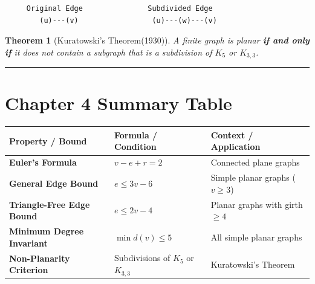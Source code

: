 \documentclass[
]{book}
\newcounter{none} %
\newtheorem{theorem}{Theorem}[chapter]
\theoremstyle{definition}
\theoremstyle{definition}
\theoremstyle{definition}
\theoremstyle{definition}
\theoremstyle{remark}
\begin{document}
\begin{verbatim}
     Original Edge               Subdivided Edge
        (u)---(v)                 (u)---(w)---(v)
\end{verbatim}

\begin{theorem}[Kuratowski's Theorem(1930)]
\protect\hypertarget{thm:unnamed-chunk-33}{}\label{thm:unnamed-chunk-33}A finite graph is planar \textbf{if and only if} it does not contain a subgraph that is a subdivision of \(K_5\) or \(K_{3,3}\).
\end{theorem}

\begin{center}\rule{0.5\linewidth}{0.5pt}\end{center}

\section{Chapter 4 Summary Table}\label{chapter-4-summary-table}

{\def\LTcaptype{none} %
\begin{longtable}[]{@{}
  >{\raggedright\arraybackslash}p{}
  >{\raggedright\arraybackslash}p{}
  >{\raggedright\arraybackslash}p{}@{}}
\toprule\noalign{}
\begin{minipage}[b]{\linewidth}\raggedright
Property / Bound
\end{minipage} & \begin{minipage}[b]{\linewidth}\raggedright
Formula / Condition
\end{minipage} & \begin{minipage}[b]{\linewidth}\raggedright
Context / Application
\end{minipage} \\
\midrule\noalign{}
\endhead
\bottomrule\noalign{}
\endlastfoot
\textbf{Euler's Formula} & \(v - e + r = 2\) & Connected plane graphs \\
\textbf{General Edge Bound} & \(e \le 3v - 6\) & Simple planar graphs (\(v \ge 3\)) \\
\textbf{Triangle-Free Edge Bound} & \(e \le 2v - 4\) & Planar graphs with girth \(\ge 4\) \\
\textbf{Minimum Degree Invariant} & \(\min d(v) \le 5\) & All simple planar graphs \\
\textbf{Non-Planarity Criterion} & Subdivisions of \(K_5\) or \(K_{3,3}\) & Kuratowski's Theorem \\
\end{longtable}
}
\end{document}

